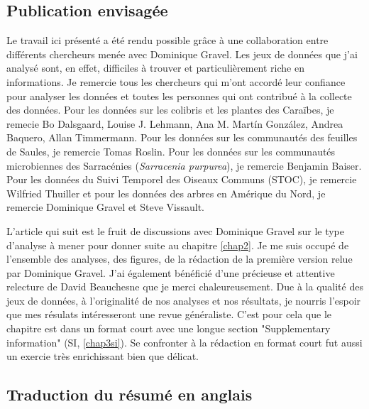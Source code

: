 \subsection{Publication envisagée}

Le travail ici présenté a été rendu possible grâce à une collaboration entre différents
chercheurs menée avec Dominique Gravel. Les jeux de données que j'ai analysé
sont, en effet, difficiles à trouver et particulièrement riche en informations.
Je remercie tous les chercheurs qui m'ont accordé leur confiance
pour analyser les données et toutes les personnes qui ont contribué à la collecte
des données. Pour les données sur les colibris et les plantes des Caraïbes,
je remecie Bo Dalsgaard, Louise J. Lehmann, Ana M. Martín González,
Andrea Baquero, Allan Timmermann. Pour les données sur les communautés des feuilles de Saules,
je remercie Tomas Roslin. Pour les données sur les communautés microbiennes des
Sarracénies (\emph{Sarracenia purpurea}), je remercie Benjamin Baiser.
Pour les données du Suivi Temporel des Oiseaux Communs (STOC), je remercie Wilfried Thuiller
et pour les données des arbres en Amérique du Nord, je remercie Dominique Gravel et Steve Vissault.

L'article qui suit est le fruit de discussions avec Dominique Gravel sur le type
d'analyse à mener pour donner suite au chapitre \ref{chap2}. Je me suis occupé
de l'ensemble des analyses, des figures, de la rédaction de la première version
relue par Dominique Gravel. J'ai également bénéficié d'une précieuse et
attentive relecture de David Beauchesne que je merci chaleureusement.
Due à la qualité des jeux de données, à l'originalité de nos analyses et
nos résultats, je nourris l'espoir que mes résulats intéresseront
une revue généraliste. C'est pour cela que le chapitre est dans un format court avec une
longue section "Supplementary information" (SI, \ref{chap3si}). Se confronter
à la rédaction en format court fut aussi un exercie très enrichissant bien que délicat.




\subsection{Traduction du résumé en anglais}

